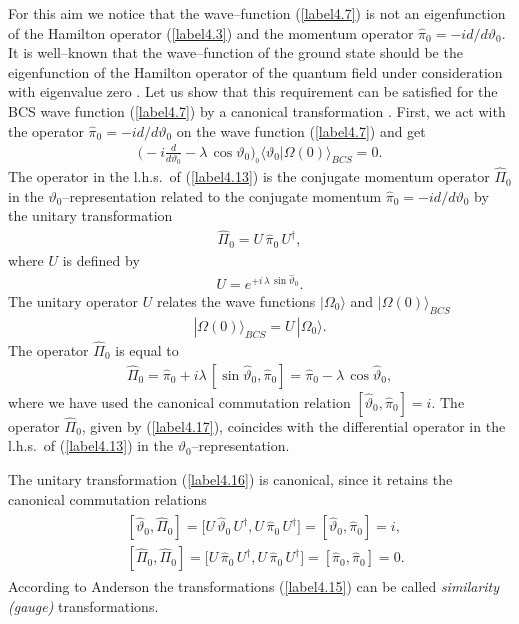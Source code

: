 \documentclass[a4paper,12pt] {article}
\begin{document}
For this aim we notice that the wave--function (\ref{label4.7}) is not
an eigenfunction of the Hamilton operator (\ref{label4.3}) and the
momentum operator $\hat{\pi}_0 = - i d/d\vartheta_0$. It is
well--known that the wave--function of the ground state should be the
eigenfunction of the Hamilton operator of the quantum field under
consideration with eigenvalue zero \cite{Wi64}. Let us show that this
requirement can be satisfied for the BCS wave function
(\ref{label4.7}) by a canonical transformation \cite{An94}. First, we
act with the operator $\hat{\pi}_0 = - i d/d\vartheta_0$ on the wave
function (\ref{label4.7}) and get
%
\begin{eqnarray}\label{label4.13}
\Big(- i \frac{d}{d\vartheta_0} -
\lambda\,\cos\vartheta_0\Big){_{_0}\langle
\vartheta_0|\Omega(0)\rangle_{BCS}} = 0.
\end{eqnarray}
%
The operator in the l.h.s.\ of (\ref{label4.13}) is the conjugate
momentum operator $\hat{\Pi}_0$ in the $\vartheta_0$--representation
related to the conjugate momentum $\hat{\pi}_0 = - i d/d\vartheta_0$
by the unitary transformation \cite{An94}
%
\begin{eqnarray}\label{label4.14}
\hat{\Pi}_0 =
U\,\hat{\pi}_0\,U^{\dagger},
\end{eqnarray}
%
where $U$ is defined by
%
\begin{eqnarray}\label{label4.15}
U = e^{\textstyle
+i\,\lambda\,\sin\hat{\vartheta}_0}.
\end{eqnarray}
%
The unitary operator $U$ relates the wave functions
$|\Omega_0\rangle$ and $|\Omega(0)\rangle_{BCS}$
%
\begin{eqnarray}\label{label4.16}
|\Omega(0)\rangle_{BCS} = U\,|\Omega_0\rangle.
\end{eqnarray}
%
The operator $\hat{\Pi}_0$ is equal to
%
\begin{eqnarray}\label{label4.17}
\hat{\Pi}_0 = \hat{\pi}_0 +
i\lambda\,[\sin\hat{\vartheta}_0,\hat{\pi}_0] = \hat{\pi}_0 -
\lambda\,\cos\hat{\vartheta}_0,
\end{eqnarray}
%
where we have used the canonical commutation relation
$[\hat{\vartheta}_0,\hat{\pi}_0] = i$. The operator $\hat{\Pi}_0$,
given by (\ref{label4.17}), coincides with the differential operator in
the l.h.s.\ of (\ref{label4.13}) in the $\vartheta_0$--representation.

The unitary transformation (\ref{label4.16}) is canonical, since it
retains the canonical commutation relations
%
\begin{eqnarray}\label{label4.18}
\begin{aligned}
&[\hat{\vartheta}_0, \hat{\Pi}_0] = \Big[U\,
\hat{\vartheta}_0\, U^{\dagger}, U\, \hat{\pi}_0\,
U^{\dagger}\Big] = [\hat{\vartheta}_0, \hat{\pi}_0] = i,\\
&[\hat{\Pi}_0, \hat{\Pi}_0] = \Big[U\, \hat{\pi}_0\,
U^{\dagger}, U\, \hat{\pi}_0\,
U^{\dagger}\Big] = [\hat{\pi}_0, \hat{\pi}_0] = 0.
\end{aligned}
\end{eqnarray}
%
According to Anderson \cite{An94} the transformations (\ref{label4.15})
can be called  {\it similarity (gauge)} transformations.
\end{document}
